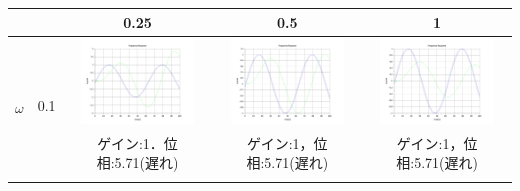 \documentclass[a4paper,11pt]{jsarticle}
\begin{document}
\begin{enumerate}
\begin{table}[H]
\begin{tabular}{|c|c|c|c|c|}
            
            &
            
            &
            0.25 
            & 
            0.5 
            &
            1 
            \\ \hline

            \multirow{6}{*}{$\omega$} 
            & 
            \multirow{2}{*}{0.1} 
            & 
            \begin{minipage}{45mm}
              \centering
              \includegraphics[width=3cm,clip]{picture/1.png}
            \end{minipage}
            &
            \begin{minipage}{45mm}
              \centering
              \includegraphics[width=3cm,clip]{picture/4.png}
            \end{minipage}
            &
            \begin{minipage}{45mm}
              \centering
              \includegraphics[width=3cm,clip]{picture/7.png}
            \end{minipage} 
            \\ \cline{3-5}

            
            &
            
            & 
            ゲイン:1．位相:5.71(遅れ) 
            & 
            ゲイン:1，位相:5.71(遅れ) 
            &
            ゲイン:1，位相:5.71(遅れ) 
            \\\cline{2-5}


\end{tabular}
\end{table}
\end{enumerate}
\end{document}
